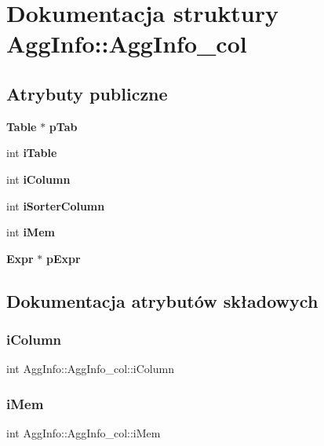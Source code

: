 \section{Dokumentacja struktury Agg\+Info\+::Agg\+Info\+\_\+col}
\label{struct_agg_info_1_1_agg_info__col}
\subsection*{Atrybuty publiczne}
\begin{DoxyCompactItemize}
\item 
\textbf{ Table} $\ast$ \textbf{ p\+Tab}
\item 
int \textbf{ i\+Table}
\item 
int \textbf{ i\+Column}
\item 
int \textbf{ i\+Sorter\+Column}
\item 
int \textbf{ i\+Mem}
\item 
\textbf{ Expr} $\ast$ \textbf{ p\+Expr}
\end{DoxyCompactItemize}


\subsection{Dokumentacja atrybutów składowych}
\mbox{\label{struct_agg_info_1_1_agg_info__col_a4cad2ce99ddf7425d358d49e40524f6b}} 
\subsubsection{iColumn}
{\footnotesize\ttfamily int Agg\+Info\+::\+Agg\+Info\+\_\+col\+::i\+Column}

\mbox{\label{struct_agg_info_1_1_agg_info__col_ae22f3dfc6f9c2dc647be1b9fbd14e896}} 
\subsubsection{iMem}
{\footnotesize\ttfamily int Agg\+Info\+::\+Agg\+Info\+\_\+col\+::i\+Mem}

\mbox{\label{struct_agg_info_1_1_agg_info__col_ae3901ad0d5b6d519a7559358f1f7248b}} 
